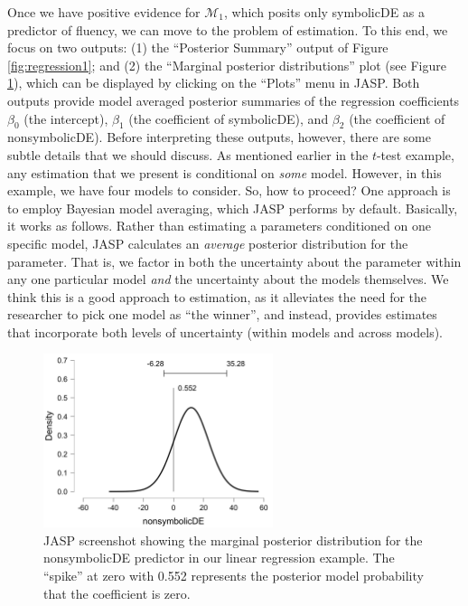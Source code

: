 \documentclass[english,,doc,floatsintext]{apa6}
\begin{document}
Once we have positive evidence for \(\mathcal{M}_{1}\), which posits only symbolicDE as a predictor of fluency, we can move to the problem of estimation. To this end, we focus on two outputs: (1) the \enquote{Posterior Summary} output of Figure \ref{fig:regression1}; and (2) the \enquote{Marginal posterior distributions} plot (see Figure \ref{fig:marginalPosterior}), which can be displayed by clicking on the \enquote{Plots} menu in JASP. Both outputs provide model averaged posterior summaries of the regression coefficients \(\beta_{0}\) (the intercept), \(\beta_{1}\) (the coefficient of symbolicDE), and \(\beta_{2}\) (the coefficient of nonsymbolicDE). Before interpreting these outputs, however, there are some subtle details that we should discuss. As mentioned earlier in the \(t\)-test example, any estimation that we present is conditional on \emph{some} model. However, in this example, we have four models to consider. So, how to proceed? One approach is to employ Bayesian model averaging, which JASP performs by default. Basically, it works as follows. Rather than estimating a parameters conditioned on one specific model, JASP calculates an \emph{average} posterior distribution for the parameter. That is, we factor in both the uncertainty about the parameter within any one particular model \emph{and} the uncertainty about the models themselves. We think this is a good approach to estimation, as it alleviates the need for the researcher to pick one model as \enquote{the winner}, and instead, provides estimates that incorporate both levels of uncertainty (within models and across models).

\begin{figure}
\centering
\includegraphics[width=0.6\textwidth,height=\textheight]{figures/marginalPosterior.png}
\caption{\label{fig:marginalPosterior}JASP screenshot showing the marginal posterior distribution for the nonsymbolicDE predictor in our linear regression example. The \enquote{spike} at zero with 0.552 represents the posterior model probability that the coefficient is zero.}
\end{figure}
\end{document}
